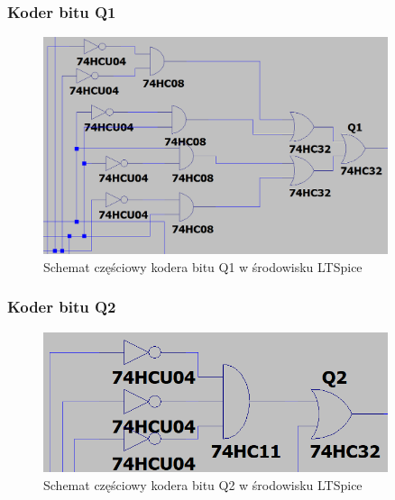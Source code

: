 \documentclass{article}
\begin{document}
\subsubsection{Koder bitu Q1}
\begin{figure}[H]
    \centering
    \begin{adjustbox}{center}
        \includegraphics[width=0.9\textwidth]{q1-r.png}
    \end{adjustbox}
    \caption{Schemat częściowy kodera bitu Q1 w środowisku LTSpice}
    \label{fig:mojobrazek}
\end{figure}
\subsubsection{Koder bitu Q2}
\begin{figure}[H]
    \centering
    \begin{adjustbox}{center}
        \includegraphics[width=0.9\textwidth]{q2-r.png}
    \end{adjustbox}
    \caption{Schemat częściowy kodera bitu Q2 w środowisku LTSpice}
    \label{fig:mojobrazek}
\end{figure}
\end{document}
